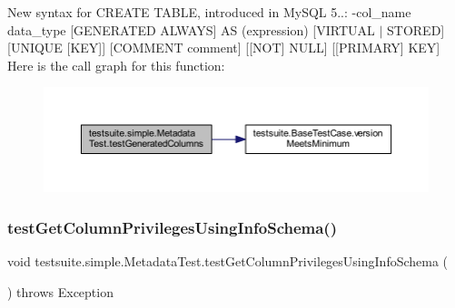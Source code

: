 New syntax for C\+R\+E\+A\+TE T\+A\+B\+LE, introduced in My\+S\+QL 5..\+: -\/col\+\_\+name data\+\_\+type \mbox{[}G\+E\+N\+E\+R\+A\+T\+ED A\+L\+W\+A\+YS\mbox{]} AS (expression) \mbox{[}V\+I\+R\+T\+U\+AL $\vert$ S\+T\+O\+R\+ED\mbox{]} \mbox{[}U\+N\+I\+Q\+UE \mbox{[}K\+EY\mbox{]}\mbox{]} \mbox{[}C\+O\+M\+M\+E\+NT comment\mbox{]} \mbox{[}\mbox{[}N\+OT\mbox{]} N\+U\+LL\mbox{]} \mbox{[}\mbox{[}P\+R\+I\+M\+A\+RY\mbox{]} K\+EY\mbox{]} Here is the call graph for this function\+:
\nopagebreak
\begin{figure}[H]
\begin{center}
\leavevmode
\includegraphics[width=350pt]{classtestsuite_1_1simple_1_1_metadata_test_a27296d9b08d2b4d91aa016482c2cef68_cgraph}
\end{center}
\end{figure}
\mbox{\label{classtestsuite_1_1simple_1_1_metadata_test_a732360d39fdbee06f425012c99944216}} 
\subsubsection{\texorpdfstring{test\+Get\+Column\+Privileges\+Using\+Info\+Schema()}{testGetColumnPrivilegesUsingInfoSchema()}}
{\footnotesize\ttfamily void testsuite.\+simple.\+Metadata\+Test.\+test\+Get\+Column\+Privileges\+Using\+Info\+Schema (\begin{DoxyParamCaption}{ }\end{DoxyParamCaption}) throws Exception}

